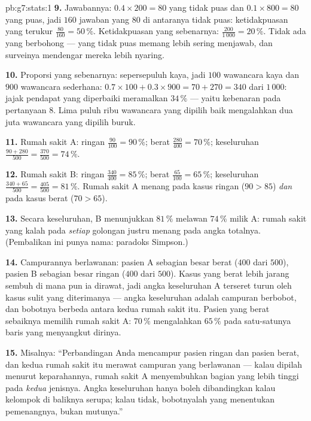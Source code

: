 \begin{solution}{pb:g7:stats:1}
\textbf{9.} Jawabannya: $0.4 \times 200 = 80$ yang tidak puas dan
$0.1 \times 800 = 80$ yang puas, jadi $160$ jawaban yang $80$ di
antaranya tidak puas: ketidakpuasan yang terukur
$\frac{80}{160} = 50\,\%$. Ketidakpuasan yang sebenarnya:
$\frac{200}{1\,000} = 20\,\%$. Tidak ada yang berbohong --- yang
tidak puas memang lebih sering menjawab, dan surveinya mendengar
mereka lebih nyaring.

\textbf{10.} Proporsi yang sebenarnya: sepersepuluh kaya, jadi $100$
wawancara kaya dan $900$ wawancara sederhana:
$0.7 \times 100 + 0.3 \times 900 = 70 + 270 = 340$ dari
$1\,000$: jajak pendapat yang diperbaiki meramalkan $34\,\%$ --- yaitu
kebenaran pada pertanyaan 8. Lima puluh ribu wawancara yang dipilih
baik mengalahkan dua juta wawancara yang dipilih buruk.

\textbf{11.} Rumah sakit A: ringan $\frac{90}{100} = 90\,\%$; berat
$\frac{280}{400} = 70\,\%$; keseluruhan
$\frac{90 + 280}{500} = \frac{370}{500} = 74\,\%$.

\textbf{12.} Rumah sakit B: ringan $\frac{340}{400} = 85\,\%$;
berat $\frac{65}{100} = 65\,\%$; keseluruhan
$\frac{340 + 65}{500} = \frac{405}{500} = 81\,\%$. Rumah sakit A
menang pada kasus ringan ($90 > 85$) \emph{dan} pada kasus berat
($70 > 65$).

\textbf{13.} Secara keseluruhan, B menunjukkan $81\,\%$ melawan
$74\,\%$ milik A: rumah sakit yang kalah pada \emph{setiap} golongan
justru menang pada angka totalnya. (Pembalikan ini punya nama:
paradoks Simpson.)

\textbf{14.} Campurannya berlawanan: pasien A sebagian besar berat
($400$ dari $500$), pasien B sebagian besar ringan ($400$ dari $500$).
Kasus yang berat lebih jarang sembuh di mana pun ia dirawat, jadi
angka keseluruhan A terseret turun oleh kasus sulit yang diterimanya
--- angka keseluruhan adalah campuran berbobot, dan bobotnya berbeda
antara kedua rumah sakit itu. Pasien yang berat sebaiknya memilih
rumah sakit A: $70\,\%$ mengalahkan $65\,\%$ pada satu-satunya baris
yang menyangkut dirinya.

\textbf{15.} Misalnya: ``Perbandingan Anda mencampur pasien ringan
dan pasien berat, dan kedua rumah sakit itu merawat campuran yang
berlawanan --- kalau dipilah menurut keparahannya, rumah sakit A
menyembuhkan bagian yang lebih tinggi pada \emph{kedua} jenisnya.
Angka keseluruhan hanya boleh dibandingkan kalau kelompok di baliknya
serupa; kalau tidak, bobotnyalah yang menentukan pemenangnya, bukan
mutunya.''

\end{solution}
